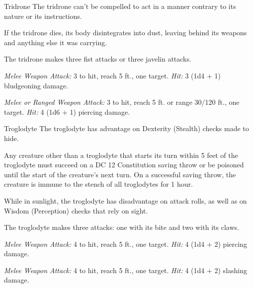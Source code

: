 \documentclass[10pt,a4paper,twoside,bg=print,twocolumn,openany,nodeprecatedcode]{dndbook}
\begin{document}
\begin{DndMonster}[float=t]{Tridrone}
\DndMonsterBasics[
armor-class = {15 (natural armor)},
hit-points = {\DndDice{3d8 + 3}},
speed = {30 ft.}
]
\DndMonsterAbilityScores[
 str = 12,
 dex = 13,
 con = 12,
 int = 9,
 wis = 10,
 cha = 9
]
\DndMonsterDetails[
senses = {truesight 120 ft., passive perception 10},
languages = {Modron},
challenge = 1/2,
]
The tridrone can't be compelled to act in a manner contrary to its nature or its instructions.

If the tridrone dies, its body disintegrates into dust, leaving behind its weapons and anything else it was carrying.

The tridrone makes three fist attacks or three javelin attacks.

\textsl{Melee Weapon Attack:} 3 to hit, reach 5 ft., one target. \textsl{Hit:} 3 (1d4 + 1) bludgeoning damage.

\textsl{Melee or Ranged Weapon Attack:} 3 to hit, reach 5 ft. or range 30/120 ft., one target. \textsl{Hit:} 4 (1d6 + 1) piercing damage.

\end{DndMonster}



\begin{DndMonster}[float=t]{Troglodyte}
\DndMonsterBasics[
armor-class = {11 (natural armor)},
hit-points = {\DndDice{2d8 + 4}},
speed = {30 ft.}
]
\DndMonsterAbilityScores[
 str = 14,
 dex = 10,
 con = 14,
 int = 6,
 wis = 10,
 cha = 6
]
\DndMonsterDetails[
skills = {Stealth +2},
senses = {darkvision 60 ft., passive perception 10},
languages = {Troglodyte},
challenge = 1/4,
]
The troglodyte has advantage on Dexterity (Stealth) checks made to hide.

Any creature other than a troglodyte that starts its turn within 5 feet of the troglodyte must succeed on a DC 12 Constitution saving throw or be poisoned until the start of the creature's next turn. On a successful saving throw, the creature is immune to the stench of all troglodytes for 1 hour.

While in sunlight, the troglodyte has disadvantage on attack rolls, as well as on Wisdom (Perception) checks that rely on sight.

The troglodyte makes three attacks: one with its bite and two with its claws.

\textsl{Melee Weapon Attack:} 4 to hit, reach 5 ft., one target. \textsl{Hit:} 4 (1d4 + 2) piercing damage.

\textsl{Melee Weapon Attack:} 4 to hit, reach 5 ft., one target. \textsl{Hit:} 4 (1d4 + 2) slashing damage.

\end{DndMonster}
\end{document}
